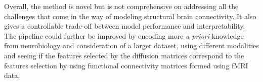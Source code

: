 \documentclass[msthesis.tex]{subfiles}
\begin{document}
Overall, the method is novel but is not comprehensive on addressing all the challenges that come in the way of modeling structural brain connectivity. It also gives a controllable trade-off between model performance and interpretability. The pipeline could further be improved by encoding more \textit{a priori} knowledge from neurobiology and consideration of a larger dataset, using different modalities and seeing if the features selected by the diffusion matrices correspond to the features selection by using functional connectivity matrices formed using fMRI data.

\iffalse
It is a good stepping stone on trying to model the brain and guide clinical decisions. It achieves good performance on gender classification/ Gender differences important guide decision making in Alzheimer's which is more common in females than in males.
\fi
\end{document}
